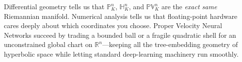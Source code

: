 \begin{moral}
Differential geometry tells us that \(\mathbb{P}_K^n\), \(\mathbb{H}_K^n\), and \(\mathbb{PV}_K^n\) are the \emph{exact same} Riemannian manifold. Numerical analysis tells us that floating-point hardware cares deeply about which coordinates you choose. Proper Velocity Neural Networks succeed by trading a bounded ball or a fragile quadratic shell for an unconstrained global chart on \(\mathbb{R}^n\)---keeping all the tree-embedding geometry of hyperbolic space while letting standard deep-learning machinery run smoothly.
\end{moral}
